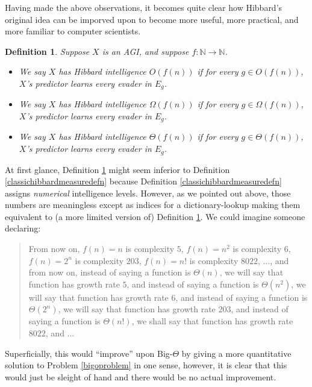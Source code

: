 \documentclass{article}
\newtheorem{definition}[theorem]{Definition}
\begin{document}
Having made the above observations, it becomes quite clear how Hibbard's original
idea can be imporved upon to become more useful, more practical, and more familiar
to computer scientists.

\begin{definition}
\label{bigointelligencedefn}
    Suppose $X$ is an AGI, and suppose $f:\mathbb N\to\mathbb N$.
    \begin{itemize}
        \item
        We say \emph{$X$ has Hibbard intelligence $O(f(n))$} if for
        every $g\in O(f(n))$, $X$'s predictor learns every evader in
        $E_g$.
        \item
        We say \emph{$X$ has Hibbard intelligence $\Omega(f(n))$} if for
        every $g\in \Omega(f(n))$, $X$'s predictor learns every evader in
        $E_g$.
        \item
        We say \emph{$X$ has Hibbard intelligence $\Theta(f(n))$} if for
        every $g\in\Theta(f(n))$, $X$'s predictor learns every evader in $E_g$.
    \end{itemize}
\end{definition}

At first glance, Definition \ref{bigointelligencedefn} might seem inferior to
Definition \ref{classichibbardmeasuredefn} because
Definition \ref{classichibbardmeasuredefn} assigns \emph{numerical} intelligence levels.
However, as we pointed out above, those numbers are meaningless except as indices for
a dictionary-lookup making them equivalent to (a more limited version of)
Definition \ref{bigointelligencedefn}. We could imagine someone declaring:
\begin{quote}
    From now on, $f(n)=n$ is complexity $5$, $f(n)=n^2$ is complexity $6$,
    $f(n)=2^n$ is complexity $203$,
    $f(n)=n!$ is complexity $8022$, ..., and from now on, instead of saying a
    function is $\Theta(n)$, we will say that function has growth rate $5$,
    and instead of saying a function is $\Theta(n^2)$, we will say that function
    has growth rate $6$, and instead of saying a function is $\Theta(2^n)$, we will
    say that function has growth rate $203$, and instead of saying a function is
    $\Theta(n!)$, we shall say that function has growth rate $8022$, and ...
\end{quote}
Superficially, this would ``improve'' upon Big-$\Theta$ by giving a more quantitative
solution to Problem \ref{bigoproblem} in one sense, however, it is clear
that this would just be sleight of hand and there would be no actual improvement.
\end{document}
